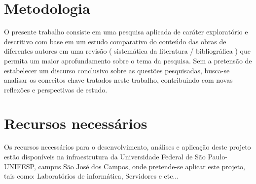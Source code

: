 \documentclass[quali]{mpit}
\begin{document}
\section{Metodologia}
O presente trabalho consiste em uma pesquisa aplicada de caráter exploratório e descritivo com base em um estudo comparativo do conteúdo das obras de diferentes autores em uma revisão ( sistemática da literatura / bibliográfica ) que
permita um maior aprofundamento sobre o tema da pesquisa. Sem a pretensão de
estabelecer um discurso conclusivo sobre as questões pesquisadas, busca-se analisar
os conceitos chave tratados neste trabalho, contribuindo com novas reflexões e 
perspectivas de estudo.

\section{Recursos necessários}
Os recursos necessários para o desenvolvimento, análises  e aplicação deste projeto estão disponíveis na infraestrutura da Universidade Federal de São Paulo-UNIFESP, campus São José dos Campos, onde pretende-se aplicar este projeto, tais como: Laboratórios de informática, Servidores e etc...




\end{document}
